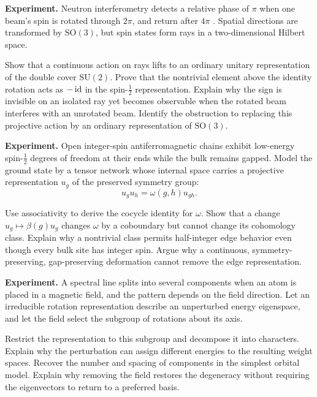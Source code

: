 \begin{exercise}
\textbf{Experiment.}
Neutron interferometry detects a relative phase of \(\pi\) when one beam's
spin is rotated through \(2\pi\), and return after \(4\pi\)
\cite{hagiwara}.  Spatial directions are transformed by
\(\mathrm{SO}(3)\), but spin states form rays in a two-dimensional Hilbert
space.

Show that a continuous action on rays lifts to an ordinary unitary
representation of the double cover \(\mathrm{SU}(2)\).  Prove that the
nontrivial element above the identity rotation acts as \(-\operatorname{id}\) in the
spin-\(\tfrac12\) representation.  Explain why the sign is invisible on an
isolated ray yet becomes observable when the rotated beam interferes with an
unrotated beam.  Identify the obstruction to replacing this projective action
by an ordinary representation of \(\mathrm{SO}(3)\).
\end{exercise}

\begin{exercise}
\textbf{Experiment.}
Open integer-spin antiferromagnetic chains exhibit low-energy spin-\(\tfrac12\)
degrees of freedom at their ends while the bulk remains gapped.  Model the
ground state by a tensor network whose internal space carries a projective
representation \(u_g\) of the preserved symmetry group:
\[
        u_g u_h=\omega(g,h)u_{gh}.
\]

Use associativity to derive the cocycle identity for \(\omega\).  Show that a
change \(u_g\mapsto\beta(g)u_g\) changes \(\omega\) by a coboundary but cannot
change its cohomology class.  Explain why a nontrivial class permits
half-integer edge behavior even though every bulk site has integer spin.
Argue why a continuous, symmetry-preserving, gap-preserving deformation
cannot remove the edge representation.
\end{exercise}

\begin{exercise}
\textbf{Experiment.}
A spectral line splits into several components when an atom is placed in a
magnetic field, and the pattern depends on the field direction.
Let an irreducible rotation representation describe an unperturbed energy
eigenspace, and let the field select the subgroup of rotations about its axis.

Restrict the representation to this subgroup and decompose it into
characters.  Explain why the perturbation can assign different energies to
the resulting weight spaces.  Recover the number and spacing of components in
the simplest orbital model.  Explain why removing the field restores the
degeneracy without requiring the eigenvectors to return to a preferred basis.
\end{exercise}

